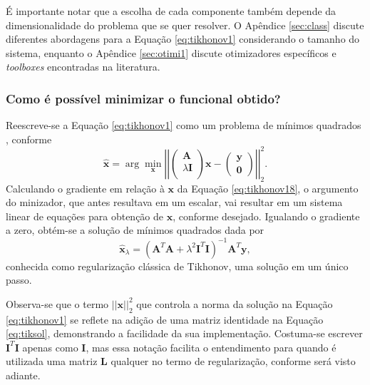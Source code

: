 É importante notar que a escolha de cada componente também depende da dimensionalidade do problema que se quer resolver. O Apêndice \ref{sec:class} discute diferentes abordagens para a Equação \eqref{eq:tikhonov1} considerando o tamanho do sistema, enquanto o Apêndice \ref{sec:otimi1} discute otimizadores específicos e \textit{toolboxes} encontradas na literatura. 


\subsubsection{Como é possível minimizar o funcional obtido?}
Reescreve-se a Equação \eqref{eq:tikhonov1} como um problema de mínimos quadrados \cite[pág. 61]{hansen2010discrete}, conforme
\begin{equation}
\hat{\mathbf{x}} = \arg\min\limits_{\mathbf{x}} 
\left|\left|
\begin{pmatrix}
\mathbf{A}\\ 
\lambda \textbf{I}\\ 
\end{pmatrix}\mathbf{x} - \begin{pmatrix}
\mathbf{y}\\ 
\mathbf{0}
\end{pmatrix} \right| \right|^2_2.
\label{eq:tikhonov18}
\end{equation} 
Calculando o gradiente em relação à $\mathbf{x}$ da Equação \eqref{eq:tikhonov18}, o argumento do minizador, que antes resultava em um escalar, vai resultar em um sistema linear de equações para obtenção de  $\mathbf{x}$, conforme desejado. Igualando o gradiente a zero, obtém-se a solução de mínimos quadrados dada por \cite[pág. 61]{hansen2010discrete}
\begin{equation}
\hat{\mathbf{x}}_{\lambda} =\left( \mathbf{A}^T \mathbf{A} + \lambda^2 \mathbf{I}^T \mathbf{I} \right)^{-1} \mathbf{A}^T \mathbf{y}, 
\label{eq:tiksol}
\end{equation}
conhecida como regularização clássica de Tikhonov, uma solução em um único passo. 

Observa-se que o termo $\vert \vert \mathbf{x} \vert \vert_2^2$ que controla a norma da solução na Equação \eqref{eq:tikhonov1} se reflete na adição de uma matriz identidade na Equação \eqref{eq:tiksol}, demonstrando a facilidade da sua implementação. Costuma-se escrever $\mathbf{I}^T \mathbf{I}$ apenas como $\mathbf{I}$, mas essa notação facilita o entendimento para quando é utilizada uma matriz $\mathbf{L}$ qualquer no termo de regularização, conforme será visto adiante.


